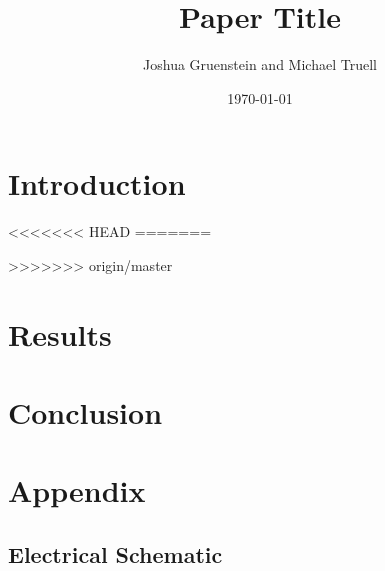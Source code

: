 \documentclass[a4paper,12pt]{article}
\title{Paper Title}
\author{Joshua Gruenstein and Michael Truell}
\date{\today}
\begin{document}
\maketitle



\section{Introduction}





<<<<<<< HEAD
=======
%

>>>>>>> origin/master
\section{Results}



\section{Conclusion}



\pagebreak
\section{Appendix}

\subsection{Electrical Schematic}



\nocite{wirefit,qlearn,backprop,practical,tutorial,kinematics}

\pagebreak


\end{document}
